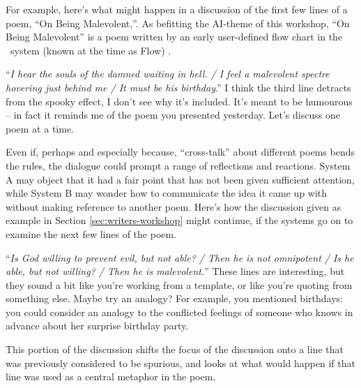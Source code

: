For example, here's what might happen in a discussion of the first few
lines of a poem, ``On Being Malevolent,''. As befitting the AI-theme
of this workshop, ``On Being Malevolent'' is a poem written by an
early user-defined flow chart in the \Fw\ system (known at the time as
{\sf Flow}) \cite{colton-flowcharting}.

\begin{center}
\begin{minipage}{.9\columnwidth}
\begin{dialogue}
 ``\emph{I hear the souls of the
  damned waiting in hell. / I feel a malevolent
  spectre hovering just behind me / It must be
  his birthday}.''
%
 I think the third line detracts
from the spooky effect, I don't see why it's
included.
%
 It's meant to be humourous -- in fact it reminds me
of the poem you presented yesterday.
%
 Let's discuss one poem at a
time.
\end{dialogue}
\end{minipage}
\end{center}

Even if, perhaps and especially because, ``cross-talk'' about
different poems bends the rules, the dialogue could prompt a range of
reflections and reactions.  System A may object that it had a fair
point that has not been given sufficient attention, while System B may
wonder how to communicate the idea it came up with without making
reference to another poem.  Here's how the discussion given as example
in Section \ref{sec:writers-workshop} might continue, if the systems
go on to examine the next few lines of the poem.
\begin{center}
\begin{minipage}{.9\columnwidth}
\begin{dialogue}
 ``\emph{Is God willing to prevent evil, but not able? / Then he is not omnipotent / Is he able, but not willing? / Then he is malevolent.}''
%
 These lines are interesting, but
they sound a bit like you're working from a
template, or like you're quoting from something
else.
%
 Maybe try an analogy?  For example, you mentioned
birthdays: you could consider an analogy to the conflicted feelings of
someone who knows in advance about her surprise birthday party.
\end{dialogue}
\end{minipage}
\end{center}

This portion of the discussion shifts the focus
of the discussion onto a line that was previously
considered to be spurious, and looks at what
would happen if that line was used as a central
metaphor in the poem.

